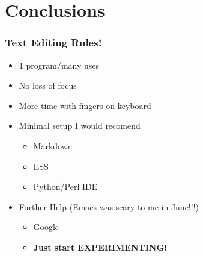 \documentclass[t,10pt]{beamer}
\begin{document}
\section{Conclusions}
\label{sec-4}
\begin{frame}
\frametitle{Text Editing Rules!}
\label{sec-4-1}

\begin{itemize}
\item 1 program/many uses
\item No loss of focus
\item More time with fingers on keyboard
\end{itemize}
\vspace{0.5}
\begin{itemize}

\item Minimal setup I would recomend
\label{sec-4-1-1}%
\begin{itemize}
\item Markdown
\item ESS
\item Python/Perl IDE
\end{itemize}

\vspace{0.5}

\item Further Help (Emacs was scary to me in June!!!)
\label{sec-4-1-2}%
\begin{itemize}
\item Google
\item \textbf{Just start EXPERIMENTING!}
\end{itemize}


\end{itemize} %
\end{frame}
\end{document}
